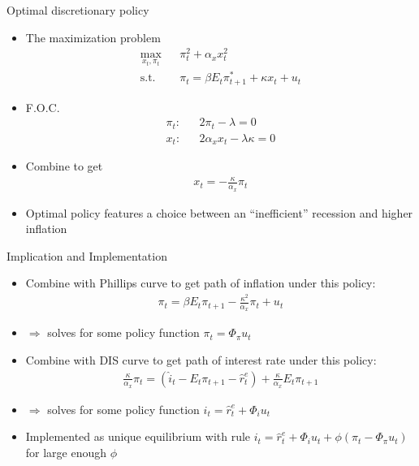 \documentclass[9pt,xcolor={dvipsnames}]{beamer}
\newcommand{\bit}{\begin{itemize}}
\newcommand{\eit}{\end{itemize}}
\begin{document}
\begin{frame}{Optimal discretionary policy}

\bit
\setlength\itemsep{1.5em}
\item The maximization problem
\begin{eqnarray}
\max_{x_t, \pi_t} && \pi_t^2 + \alpha_x x_t^2 \nonumber \\
\text{s.t. } &&  \pi_t = \beta E_t \pi^*_{t+1} + \kappa x_t + u_t \nonumber 
\end{eqnarray}

\item F.O.C.
\begin{eqnarray}
\pi_t: &&  2 \pi_t - \lambda = 0 \nonumber \\
x_t: && 2 \alpha_x x_t - \lambda \kappa = 0 \nonumber
\end{eqnarray}

\item Combine to get
\begin{eqnarray}
x_t = - \frac{\kappa}{\alpha_x} \pi_t \nonumber
\end{eqnarray}

\item Optimal policy features a choice between an ``inefficient'' recession and higher inflation



\eit

\end{frame}


\begin{frame}{Implication and Implementation}

\bit
\setlength\itemsep{1.5em}
\item Combine with Phillips curve to get path of inflation under this policy:
\begin{eqnarray}
\pi_t = \beta E_t \pi_{t+1} - \frac{\kappa^2}{\alpha_x} \pi_t + u_t \nonumber 
\end{eqnarray}

\item $\Rightarrow$ solves for some policy function $\pi_t = \Phi_{\pi} u_t$

\item Combine with DIS curve to get path of interest rate under this policy:
\begin{eqnarray}
\frac{\kappa}{\alpha_x} \pi_t = (\hat i_t-E_t \pi_{t+1}-\hat r^e_t) + \frac{\kappa}{\alpha_x} E_t \pi_{t+1}\nonumber 
\end{eqnarray}	

\item $\Rightarrow$ solves for some policy function $i_t = \hat r^e_t + \Phi_{i} u_t$

\item Implemented as unique equilibrium with rule $i_t = \hat r^e_t + \Phi_{i} u_t + \phi (\pi_t-\Phi_{\pi} u_t)$ for large enough $\phi$


\eit

\end{frame}
\end{document}
